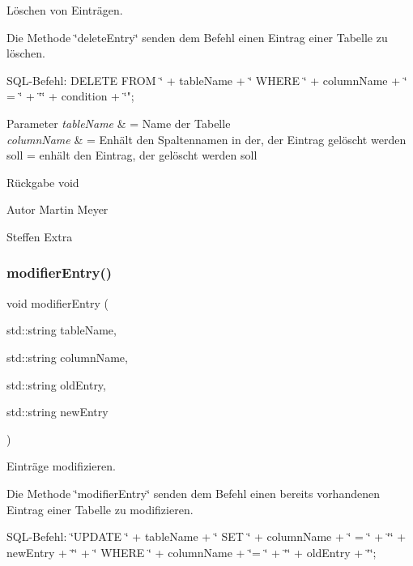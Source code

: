 Löschen von Einträgen. 

Die Methode \char`\"{}delete\+Entry\char`\"{} senden dem Befehl einen Eintrag einer Tabelle zu löschen.~\newline


S\+Q\+L-\/\+Befehl\+: D\+E\+L\+E\+TE F\+R\+OM \char`\"{} + table\+Name + \char`\"{} W\+H\+E\+RE \char`\"{} + column\+Name + \char`\"{} = \char`\"{} + \char`\"{}\textquotesingle{}\char`\"{} + condition + \char`\"{}\textquotesingle{}";


\begin{DoxyParams}{Parameter}
{\em table\+Name} & = Name der Tabelle \\
\hline
{\em column\+Name} & = Enhält den Spaltennamen in der, der Eintrag gelöscht werden soll  = enhält den Eintrag, der gelöscht werden soll\\
\hline
\end{DoxyParams}
\begin{DoxyReturn}{Rückgabe}
void
\end{DoxyReturn}
\begin{DoxyAuthor}{Autor}
Martin Meyer 

Steffen Extra 
\end{DoxyAuthor}
\mbox{\label{entry_8hpp_ab254b5514a4950c7479bc4d513c438dc}} 
\subsubsection{modifier\+Entry()}
{\footnotesize\ttfamily void modifier\+Entry (\begin{DoxyParamCaption}\item[{std\+::string}]{table\+Name,  }\item[{std\+::string}]{column\+Name,  }\item[{std\+::string}]{old\+Entry,  }\item[{std\+::string}]{new\+Entry }\end{DoxyParamCaption})}



Einträge modifizieren. 

Die Methode \char`\"{}modifier\+Entry\char`\"{} senden dem Befehl einen bereits vorhandenen Eintrag einer Tabelle zu modifizieren.~\newline


S\+Q\+L-\/\+Befehl\+: \char`\"{}\+U\+P\+D\+A\+T\+E \char`\"{} + table\+Name + \char`\"{} S\+E\+T \char`\"{} + column\+Name + \char`\"{} = \char`\"{} + \char`\"{}\textquotesingle{}\char`\"{} + new\+Entry + \char`\"{}\textquotesingle{}\char`\"{} + \char`\"{} W\+H\+E\+R\+E \char`\"{} + column\+Name + \char`\"{}= \char`\"{} + \char`\"{}\textquotesingle{}\char`\"{} + old\+Entry + \char`\"{}\textquotesingle{}\char`\"{};


